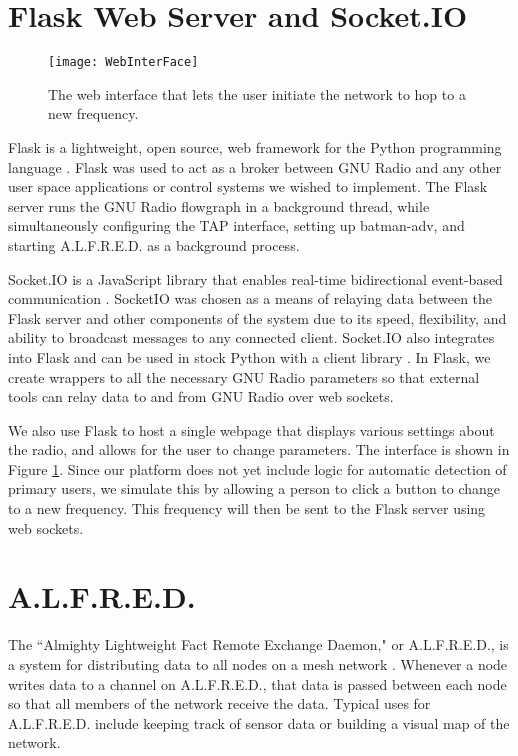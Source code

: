 \section{Flask Web Server and Socket.IO}

\begin{figure}
	\centering
	\texttt{[image: WebInterFace]}
	\caption{The web interface that lets the user initiate the network to hop to a new frequency.}
	\label{fig:WebInterface}
\end{figure}

Flask is a lightweight, open source, web framework for the Python programming language \cite{0011}. Flask was used to act as a broker between GNU Radio and any other user space applications or control systems we wished to implement. The Flask server runs the GNU Radio flowgraph in a background thread, while simultaneously configuring the TAP interface, setting up batman-adv, and starting A.L.F.R.E.D. as a background process. 

Socket.IO is a JavaScript library that enables real-time bidirectional event-based communication \cite{0012}.  SocketIO was chosen as a means of relaying data between the Flask server and other components of the system due to its speed, flexibility, and ability to broadcast messages to any connected client. Socket.IO also integrates into Flask \cite{0013} and can be used in stock Python with a client library \cite{0014}. In Flask, we create wrappers to all the necessary GNU Radio parameters so that external tools can relay data to and from GNU Radio over web sockets.  

We also use Flask to host a single webpage that displays various settings about the radio, and allows for the user to change parameters. The interface is shown in Figure \ref{fig:WebInterface}. Since our platform does not yet include logic for automatic detection of primary users, we simulate this by allowing a person to click a button to change to a new frequency. This frequency will then be sent to the Flask server using web sockets.  

\section{A.L.F.R.E.D.}

 The ``Almighty Lightweight Fact Remote Exchange Daemon," or A.L.F.R.E.D., is a system for distributing data to all nodes on a mesh network \cite{0015}. Whenever a node writes data to a channel on A.L.F.R.E.D., that data is passed between each node so that all members of the network receive the data. Typical uses for A.L.F.R.E.D. include keeping track of sensor data or building a visual map of the network. 

